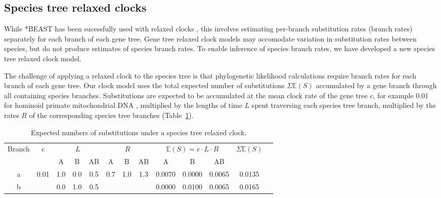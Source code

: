 \documentclass[12pt]{article}
\begin{document}
\subsection*{Species tree relaxed clocks}

While *BEAST has been sucessfully used with relaxed clocks
\citep{Berv2014120,Lambert2015146}, this involves estimating per-branch
substitution rates (branch rates) separately for each branch of each gene tree.
Gene tree relaxed clock models may accomodate variation in substitution rates
between species, but do not produce estimates of species branch rates. To enable
inference of species branch rates, we have developed a new species tree relaxed
clock model.

The challenge of applying a relaxed clock to the species tree is that
phylogenetic likelihood calculations require branch rates for each branch of
each gene tree. Our clock model uses the total expected number of substitutions
$\Sigma \mathbb{E}(S)$ accumulated by a gene branch through all containing
species branches. Substitutions are expected to be accumulated at the mean
clock rate of the gene tree $c$, for example 0.01 for hominoid primate
mitochondrial DNA \citep{doi:10.1146/annurev.es.18.110187.001413}, multiplied
by the lengths of time $L$ spent traversing each species tree branch, multiplied
by the rates $R$ of the corresponding species tree branches
(Table~\ref{tab:branchRateModel}).

\begin{table}[htb!]
\centering
\caption{Expected numbers of substitutions under a species tree relaxed clock.}
\label{tab:branchRateModel}
\begin{threeparttable}
\begin{adjustbox}{center}
\begin{tabular}{|c|c|c|c|c|c|c|c|c|c|c|c|c|}
\hline
\multirow{2}{*}{Branch} & \multirow{2}{*}{$c$} & \multicolumn{3}{c|}{$L$} & \multicolumn{3}{c|}{$R$} & \multicolumn{3}{c|}{$\mathbb{E}(S) = c\cdot L\cdot R$} & \multirow{2}{*}{$\Sigma \mathbb{E}(S)$}\tabularnewline
\cline{3-11}
 & & A & B & AB & A & B & AB & A & B & AB & \tabularnewline
\hline
a & \multirow{2}{*}{0.01} & 1.0 & 0.0 & 0.5 & \multirow{2}{*}{0.7} & \multirow{2}{*}{1.0} & \multirow{2}{*}{1.3} & 0.0070 & 0.0000 & 0.0065 & 0.0135\tabularnewline
\cline{1-1} \cline{3-5} \cline{9-12}
b & & 0.0 & 1.0 & 0.5 & & & & 0.0000 & 0.0100 & 0.0065 & 0.0165\tabularnewline
\hline
\end{tabular}
\end{adjustbox}
\end{threeparttable}
\end{table}
\end{document}
